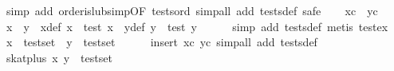 \begin{isabellebody}
%
\isadelimproof
%
\endisadelimproof
%
\isatagproof
{}\isamarkupfalse%
\ {}simp\ add{}\ order{}is{}lub{}simp{}OF\ tests{}ord{}{}\ simp{}all\ add{}\ tests{}def{}\ safe{}\isanewline
\ \ \isamarkupfalse%
\ xc\ \ yc\ \isamarkupfalse%
\ x{}\ \ y{}\ \ x{}{}def{}\ {}x\ {}\ test\ x{}{}\ \ y{}{}def{}\ {}y\ {}\ test\ y{}{}\isanewline
\ \ \ \ \isamarkupfalse%
\ {}simp\ add{}\ tests{}def{}\ metis\ test{}ex{}\isanewline
\isanewline
\ \ \isamarkupfalse%
\ {}x\ {}\ test{}set{}\ \ {}y\ {}\ test{}set{}\isanewline
\ \ \ \ \isamarkupfalse%
\ {}insert\ xc\ yc{}\ simp{}all\ add{}\ tests{}def{}\isanewline
\isanewline
\ \ \isamarkupfalse%
\ {}skat{}plus\ x\ y\ {}\ test{}set{}\isanewline

\end{isabellebody}
